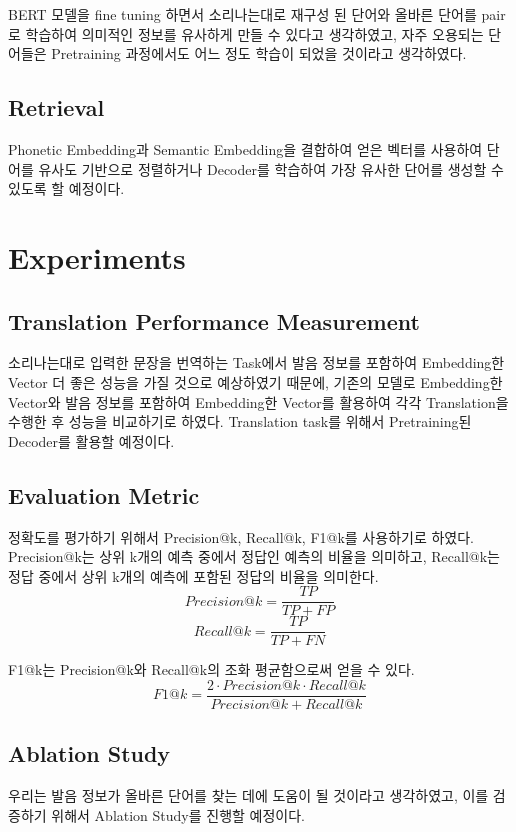 \documentclass[11pt]{article}
\begin{document}
BERT 모델을 fine tuning 하면서 소리나는대로 재구성 된 단어와 올바른 단어를 pair로 학습하여 의미적인 정보를 유사하게 만들 수 있다고 생각하였고, 자주 오용되는 단어들은 Pretraining 과정에서도 어느 정도 학습이 되었을 것이라고 생각하였다.

\subsection{Retrieval}
Phonetic Embedding과 Semantic Embedding을 결합하여 얻은 벡터를 사용하여 단어를 유사도 기반으로 정렬하거나 Decoder를 학습하여 가장 유사한 단어를 생성할 수 있도록 할 예정이다.

\section{Experiments}
\subsection{Translation Performance Measurement}
소리나는대로 입력한 문장을 번역하는 Task에서 발음 정보를 포함하여 Embedding한 Vector 더 좋은 성능을 가질 것으로 예상하였기 때문에, 기존의 모델로 Embedding한 Vector와 발음 정보를 포함하여 Embedding한 Vector를 활용하여 각각 Translation을 수행한 후 성능을 비교하기로 하였다. Translation task를 위해서 Pretraining된 Decoder를 활용할 예정이다.

\subsection{Evaluation Metric}
정확도를 평가하기 위해서 Precision@k, Recall@k, F1@k를 사용하기로 하였다.
Precision@k는 상위 k개의 예측 중에서 정답인 예측의 비율을 의미하고, Recall@k는 정답 중에서 상위 k개의 예측에 포함된 정답의 비율을 의미한다.
\begin{equation*}
    Precision@k = \frac{TP}{TP + FP}
\end{equation*}
\begin{equation*}
    Recall@k = \frac{TP}{TP + FN}
\end{equation*}

F1@k는 Precision@k와 Recall@k의 조화 평균함으로써 얻을 수 있다.
\begin{equation*}
    F1@k = \frac{2 \cdot Precision@k \cdot Recall@k}{Precision@k + Recall@k}
\end{equation*}
\subsection{Ablation Study}
우리는 발음 정보가 올바른 단어를 찾는 데에 도움이 될 것이라고 생각하였고, 이를 검증하기 위해서 Ablation Study를 진행할 예정이다.
\end{document}
